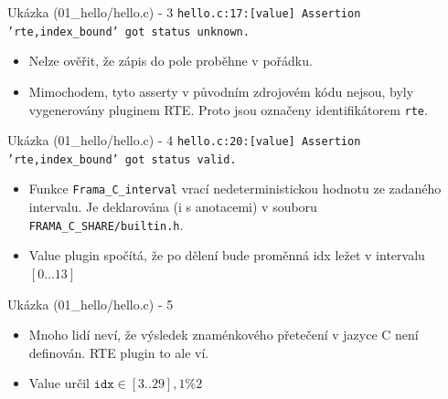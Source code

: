 \documentclass[11pt]{beamer}
\begin{document}
\begin{frame}{Ukázka (01\_hello/hello.c) - 3}
	\lstFirstValueMainPartOne
\texttt{hello.c:17:[value] Assertion 'rte,index\_bound' got status unknown.}
	\begin{itemize}
			\item Nelze ověřit, že zápis do pole proběhne v pořádku.
			\item Mimochodem, tyto asserty v původním zdrojovém kódu nejsou, byly vygenerovány pluginem RTE. Proto jsou označeny identifikátorem \texttt{rte}.
	\end{itemize}
\end{frame}


\begin{frame}{Ukázka (01\_hello/hello.c) - 4}
	\lstFirstValueMainPartTwo
	\texttt{hello.c:20:[value] Assertion 'rte,index\_bound' got status valid.}
	\begin{itemize}
		\item Funkce \texttt{Frama\_C\_interval} vrací nedeterministickou hodnotu ze zadaného intervalu. Je deklarována (i s anotacemi) v souboru \texttt{FRAMA\_C\_SHARE/builtin.h}.
		\item Value plugin spočítá, že po dělení bude proměnná idx ležet v intervalu
			\( [ 0 \ldots 13 ] \)
	\end{itemize}
\end{frame}




\begin{frame}{Ukázka (01\_hello/hello.c) - 5}
	\lstFirstValueMainPartThree
	\begin{itemize}
			\item Mnoho lidí neví, že výsledek znaménkového přetečení 
				v jazyce C není definován. RTE plugin to ale ví.
			\item Value určil \( \texttt{idx} \in [3..29],1 \%2 \)

	\end{itemize}
\end{frame}
\end{document}
